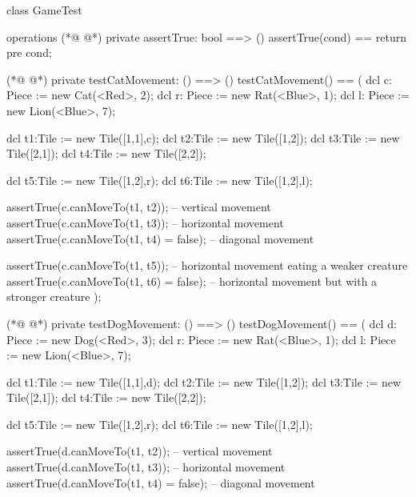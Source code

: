 \begin{vdmpp}[breaklines=true]
class GameTest

operations
(*@
\label{assertTrue:4}
@*)
 private assertTrue: bool ==> ()
                assertTrue(cond) == return
                pre cond;
                
(*@
\label{testCatMovement:8}
@*)
  private testCatMovement: () ==> ()
                testCatMovement() ==
                (
                        dcl c: Piece := new Cat(<Red>, 2);
                        dcl r: Piece := new Rat(<Blue>, 1);
                        dcl l: Piece := new Lion(<Blue>, 7);
                        
             dcl t1:Tile := new Tile([1,1],c);
             dcl t2:Tile := new Tile([1,2]);
             dcl t3:Tile := new Tile([2,1]);
             dcl t4:Tile := new Tile([2,2]);
             
             dcl t5:Tile := new Tile([1,2],r);
             dcl t6:Tile := new Tile([1,2],l);
             
             assertTrue(c.canMoveTo(t1, t2)); -- vertical movement
             assertTrue(c.canMoveTo(t1, t3)); -- horizontal movement
             assertTrue(c.canMoveTo(t1, t4) = false); -- diagonal movement
             
             assertTrue(c.canMoveTo(t1, t5)); -- horizontal movement eating a weaker creature
             assertTrue(c.canMoveTo(t1, t6) = false); -- horizontal movement but with a stronger creature
                );
                
(*@
\label{testDogMovement:31}
@*)
  private testDogMovement: () ==> ()
                testDogMovement() ==
                (
                        dcl d: Piece := new Dog(<Red>, 3);
                        dcl r: Piece := new Rat(<Blue>, 1);
                        dcl l: Piece := new Lion(<Blue>, 7);
                        
             dcl t1:Tile := new Tile([1,1],d);
             dcl t2:Tile := new Tile([1,2]);
             dcl t3:Tile := new Tile([2,1]);
             dcl t4:Tile := new Tile([2,2]);
             
             dcl t5:Tile := new Tile([1,2],r);
             dcl t6:Tile := new Tile([1,2],l);
             
             assertTrue(d.canMoveTo(t1, t2)); -- vertical movement
             assertTrue(d.canMoveTo(t1, t3)); -- horizontal movement
             assertTrue(d.canMoveTo(t1, t4) = false); -- diagonal movement
             

\end{vdmpp}
